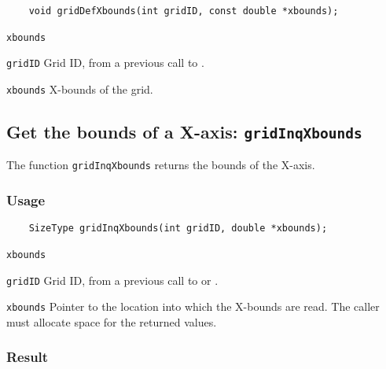 \begin{verbatim}
    void gridDefXbounds(int gridID, const double *xbounds);
\end{verbatim}

\hspace*{4mm}\begin{minipage}[]{15cm}
\begin{deflist}{\texttt{xbounds}\ }
\item[\texttt{gridID}]
Grid ID, from a previous call to {}.
\item[\texttt{xbounds}]
X-bounds of the grid.

\end{deflist}
\end{minipage}


\subsection{Get the bounds of a X-axis: \texttt{gridInqXbounds}}
\label{gridInqXbounds}

The function {\texttt{gridInqXbounds}} returns the bounds of the X-axis.

\subsubsection*{Usage}

\begin{verbatim}
    SizeType gridInqXbounds(int gridID, double *xbounds);
\end{verbatim}

\hspace*{4mm}\begin{minipage}[]{15cm}
\begin{deflist}{\texttt{xbounds}\ }
\item[\texttt{gridID}]
Grid ID, from a previous call to {} or {}.
\item[\texttt{xbounds}]
Pointer to the location into which the X-bounds are read.
                    The caller must allocate space for the returned values.

\end{deflist}
\end{minipage}

\subsubsection*{Result}

